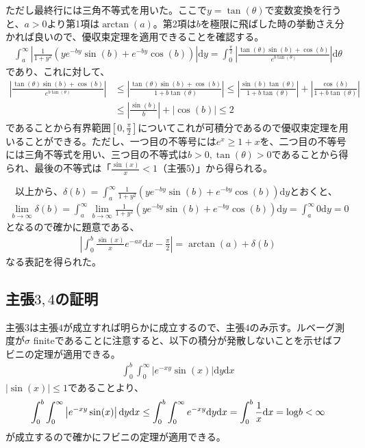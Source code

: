 \documentclass{article}
\begin{document}
ただし最終行には三角不等式を用いた。ここで$y = \tan(\theta)$で変数変換を行うと、$a > 0$より第1項は$\arctan(a)$。第2項は$b$を極限に飛ばした時の挙動さえ分かれば良いので、優収束定理を適用できることを確認する。
\begin{align*}
	 \int_a^{\infty} \left|  \frac{1}{1 + y^2} \left( ye^{-by} \sin(b) + e^{-by} \cos(b)\right) \right| \mathrm{d}y = \int_0^{\frac{\pi}{2}} \left|  \frac{\tan(\theta) \sin(b) + \cos(b)}{e^{b\tan(\theta)}} \right| \mathrm{d}\theta
\end{align*}
であり、これに対して、
\begin{align*}
	\left|  \frac{\tan(\theta) \sin(b) + \cos(b)}{e^{b\tan(\theta)}} \right| &\leq \left| \frac{\tan(\theta) \sin(b) + \cos(b)}{1 + b\tan(\theta)} \right| \leq \left| \frac{\sin(b)\tan(\theta)}{1 + b\tan(\theta)}\right| +  \left|\frac{\cos(b)}{1 + b\tan(\theta)} \right| \\[8pt]
	&\leq \left| \frac{\sin(b)}{b} \right| + \left| \cos(b) \right| \leq 2
\end{align*}
であることから有界範囲$[0, \frac{\pi}{2}]$についてこれが可積分であるので優収束定理を用いることができる。ただし、一つ目の不等号には$e^x \geq 1 + x$を、二つ目の不等号には三角不等式を用い、三つ目の不等式は$b > 0, \tan(\theta) > 0$であることから得られ、最後の不等式は「$\frac{\sin(x)}{x} < 1$（主張$5$）」から得られる。

　以上から、$\delta(b) = \int_a^{\infty}  \frac{1}{1 + y^2} \left( ye^{-by} \sin(b) + e^{-by} \cos(b)\right) \mathrm{d}y $とおくと、
\begin{align*}
	\lim_{b \to \infty} \delta(b) = \int_a^{\infty} \lim_{b \to \infty} \frac{1}{1 + y^2} \left( ye^{-by} \sin(b) + e^{-by} \cos(b)\right) \mathrm{d}y = \int_a^{\infty} 0 \mathrm{d}y = 0
\end{align*}
となるので確かに題意である、
\begin{align*}
	\left| \int_0^b \frac{\sin(x)}{x} e^{-ax} \mathrm{d}x - \frac{\pi}{2} \right| = \arctan(a) + \delta (b)
\end{align*}
なる表記を得られた。

\subsection{主張$3,4$の証明}
主張$3$は主張$4$が成立すれば明らかに成立するので、主張$4$のみ示す。ルベーグ測度が$\sigma$ finiteであることに注意すると、以下の積分が発散しないことを示せばフビニの定理が適用できる。
\begin{align*}
	\int_0^b \int_0^{\infty} \left| e^{-xy}  \sin(x) \right| \mathrm{d}y \mathrm{d}x
\end{align*}
$\left| \sin(x) \right| \leq 1$であることより、
\begin{align*}
	\int_0^b \int_0^{\infty} \left| e^{-xy}  \sin(x) \right| \mathrm{d}y \mathrm{d}x \leq \int_0^b \int_0^{\infty} e^{-xy} \mathrm{d}y \mathrm{d}x = \int_0^b \frac{1}{x} \mathrm{d}x = {\rm log}b < \infty
\end{align*}
が成立するので確かにフビニの定理が適用できる。
\end{document}
